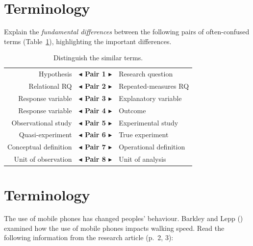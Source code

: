 \documentclass[
  11pt,
  a4paper,
  krantz2]{krantz}
\begin{document}
\section{Terminology}\label{UnderstandingTerminology1}

Explain the \emph{fundamental differences} between the following pairs of often-confused terms (Table~\ref{tab:SimilarTerms}), highlighting the important differences.

\begin{table}
\centering
\caption{\label{tab:SimilarTerms}Distinguish the similar terms.}
\centering
\fontsize{10}{12}\selectfont
\begin{tabular}[t]{r>{}cl}
\toprule
Hypothesis & \textbf{$\blacktriangleleft$ Pair 1 $\blacktriangleright$} & Research question\\
Relational RQ & \textbf{$\blacktriangleleft$ Pair 2 $\blacktriangleright$} & Repeated-measures RQ\\
\addlinespace
Response variable & \textbf{$\blacktriangleleft$ Pair 3 $\blacktriangleright$} & Explanatory variable\\
Response variable & \textbf{$\blacktriangleleft$ Pair 4 $\blacktriangleright$} & Outcome\\
\addlinespace
Observational study & \textbf{$\blacktriangleleft$ Pair 5 $\blacktriangleright$} & Experimental study\\
Quasi-experiment & \textbf{$\blacktriangleleft$ Pair 6 $\blacktriangleright$} & True experiment\\
\addlinespace
Conceptual definition & \textbf{$\blacktriangleleft$ Pair 7 $\blacktriangleright$} & Operational definition\\
Unit of observation & \textbf{$\blacktriangleleft$ Pair 8 $\blacktriangleright$} & Unit of analysis\\
\bottomrule
\end{tabular}
\end{table}

\section{Terminology}\label{UnderstandingTerminology2}

The use of mobile phones has changed peoples' behaviour.
Barkley and Lepp () examined how the use of mobile phones impacts walking speed.
Read the following information from the research article (p.~2, 3):
\end{document}
